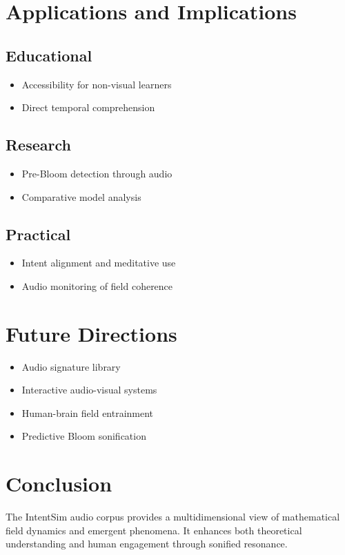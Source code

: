 \documentclass[12pt]{article}
\begin{document}
\section{Applications and Implications}
\subsection{Educational}
\begin{itemize}
  \item Accessibility for non-visual learners
  \item Direct temporal comprehension
\end{itemize}

\subsection{Research}
\begin{itemize}
  \item Pre-Bloom detection through audio
  \item Comparative model analysis
\end{itemize}

\subsection{Practical}
\begin{itemize}
  \item Intent alignment and meditative use
  \item Audio monitoring of field coherence
\end{itemize}

\section{Future Directions}
\begin{itemize}
  \item Audio signature library
  \item Interactive audio-visual systems
  \item Human-brain field entrainment
  \item Predictive Bloom sonification
\end{itemize}

\section{Conclusion}
The IntentSim audio corpus provides a multidimensional view of mathematical field dynamics and emergent phenomena. It enhances both theoretical understanding and human engagement through sonified resonance.
\end{document}
